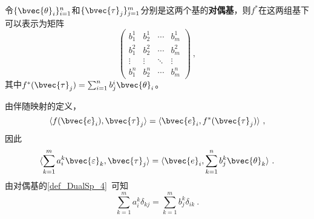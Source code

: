 令$\{\bvec{\theta}_i\}_{i=1}^n$和$\{\bvec{\tau}_j\}_{j=1}^m$分别是这两个基的\textbf{对偶基}，则$f^*$在这两组基下可以表示为矩阵
\begin{equation}
\begin{pmatrix}
b^1_1&b^1_2&\cdots&b^1_m\\
b^2_1&b^2_2&\cdots&b^2_m\\
\vdots&\vdots&\ddots&\vdots\\
b^n_1&b^n_2&\cdots&b^n_m
\end{pmatrix}~, 
\end{equation}
其中$f^*(\bvec{\tau}_j)=\sum_{i=1}^n b^i_j\bvec{\theta}_i$。

由伴随映射的定义，
\begin{equation}
\langle f(\bvec{e}_i), \bvec{\tau}_j \rangle =\langle \bvec{e}_i, f^*(\bvec{\tau}_j) \rangle ~, 
\end{equation}
因此
\begin{equation}
\langle \sum_{k=1}^m a^k_i\bvec{\varepsilon}_k, \bvec{\tau}_j \rangle =\langle \bvec{e}_i, \sum_{k=1}^n b^k_j\bvec{\theta}_k \rangle ~. 
\end{equation}
由对偶基的\autoref{def_DualSp_4}~可知
\begin{equation}
\sum_{k=1}^m a^k_i\delta_{kj} = \sum_{k=1}^m b^k_j\delta_{ik}~. 
\end{equation}

























